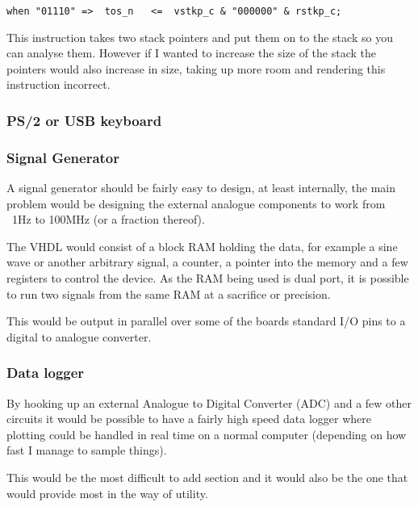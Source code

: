 \documentclass	[a4paper, 10pt]	{article}
\begin{document}
        
\begin{lstlisting}
when "01110" =>  tos_n   <=  vstkp_c & "000000" & rstkp_c; 
\end{lstlisting}

        This instruction takes two stack pointers and put them on to the stack so
        you can analyse them. However if I wanted to increase the size of the
        stack the pointers would also increase in size, taking up more room and
        rendering this instruction incorrect.

      \subsubsection{PS/2 or USB keyboard}
      \subsubsection{Signal Generator}

      A signal generator should be fairly easy to design, at least internally, the
      main problem would be designing the external analogue components to work from
      ~1Hz to 100MHz (or a fraction thereof).

      The VHDL would consist of a block RAM holding the data, for example a sine wave
      or another arbitrary signal, a counter, a pointer into the memory and a few
      registers to control the device. As the RAM being used is dual port, it is
      possible to run two signals from the same RAM at a sacrifice or precision.

      This would be output in parallel over some of the boards standard I/O pins
      to a digital to analogue converter.

      \subsubsection{Data logger}

      By hooking up an external Analogue to Digital Converter (ADC) and a few other
      circuits it would be possible to have a fairly high speed data logger where
      plotting could be handled in real time on a normal computer (depending on how
      fast I manage to sample things).

      This would be the most difficult to add section and it would also be the one
      that would provide most in the way of utility.
\end{document}
